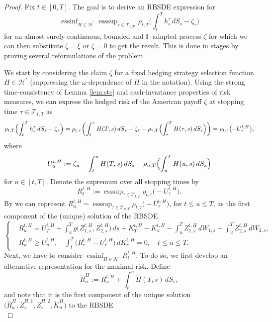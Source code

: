 \documentclass{article}
\DeclareMathOperator*{\essinf}{ess inf}
\DeclareMathOperator*{\esssup}{ess sup}
\begin{document}
\begin{proof}
	Fix $t\in [0, T]$. The goal is to derive an RBSDE expression for
	\[
 		\essinf_{H\in \mathcal H^\prime} \esssup_{\tau\in \mathcal{T}_{t,T}}\, \rho_{t,T}\biggl(\int_t^T h_s^\tau \, dS_s -\zeta_\tau\biggr)
	\]
	for an almost surely continuous, bounded and $\mathbb{F}$-adapted process $\zeta$ for which we can then substitute $\zeta = \xi$ or $\zeta = 0$ to get the result. This is done in stages by proving several reformulations of the problem.

	We start by considering the claim $\zeta$ for a fixed hedging strategy selection function $H\in \mathcal H^\prime$ (suppressing the $\omega$-dependence of $H$ in the notation). Using 
	the strong time-consistency of Lemma \ref{lem:stc} and cash-invariance properties of risk measures, we can express the hedged risk of the American payoff $\zeta$ at 
	stopping time $\tau\in \mathcal T_{t,T}$ as
	\[
		\rho_{t,T}\Bigl(\int_t^Th_s^\tau \,dS_s -\zeta_\tau\Bigr)= \rho_{t,\tau}\biggl(\int_t^\tau H(T, s) \, dS_s-\zeta_\tau -\rho_{\tau, T}
		\Bigl(\int_\tau^T H(\tau, s) \, dS_s\Bigr )\biggr)\\
		= \rho_{t,\tau}\bigl(-U_{\tau}^{t,H}\bigr),
	\]
	where
	\[
		U_u^{t,H} := \zeta_u - \int_t^u H(T, s)\, dS_s +\rho_{u, T}\Bigl(\int_u^T H(u, s) \, dS_s\Bigr )
	\]
	for $u \in [t,T]$. Denote the supremum over all stopping times by 
	\[
		R^{t,H}_t:= \esssup_{\tau\in \mathcal T_{t,T}} \rho_{t,\tau}\bigl(-U_{\tau}^{t,H}\bigr).
	\]
	By \cite[Proposition 3.1]{KLQT02} we can represent $R^{t,H}_u = \esssup_{\tau\in \mathcal T_{u,T}} \rho_{t,\tau}\bigl(-U_{\tau}^{t,H}\bigr)$, for $t\leq u\leq T$, as 
	the first component of the (unique) solution of the RBSDE
	\[
		\left\{\begin{array}{ll}
		& R^{t,H}_u =  U_T^{t,H} +\int_u^T g\bigl(Z_{1,s}^{t,H}, Z_{2,s}^{t,H}\bigr)\, ds +K_T^{t,H} -K_u^{t,H}-\int_u^TZ^{t,H}_{1,s} \, dW_{1,s} - \int_u^T 
		Z_{2,s}^{t,H} \, dW_{2,s}, \\
		&R^{t,H}_u \geq U_u^{t,H}, \quad \int_t^T\bigl(R^{t,H}_r -U_r^{t,H}\bigr) \, dK_r^{t,H}=0, \quad t\leq u\leq T.
		\end{array} \right.
	\]
	Next, we have to consider $ \essinf_{H\in \mathcal H^\prime} R^{t,H}_t$. To do so, we first develop an alternative representation for the maximal risk. Define
	\[
		\ddot{R}^H_{u} := R^{t,H}_u + \int_t^u H(T, s) \, dS_s,
	\] 
	and note that it is the first component of the unique solution $\bigl(\ddot{R}^H_{u}, \ddot{Z}_{s}^{H,1}, \ddot{Z}_{s}^{H,2}, \ddot{K}_{u}^H\bigr)$ to the RBSDE
	\[
\]
\end{proof}
\end{document}
